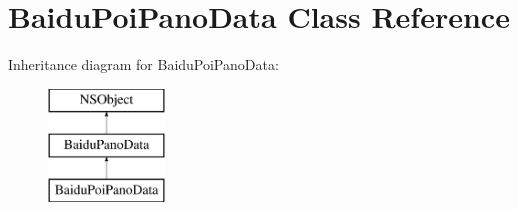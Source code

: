 \hypertarget{interface_baidu_poi_pano_data}{}\section{Baidu\+Poi\+Pano\+Data Class Reference}
\label{interface_baidu_poi_pano_data}
Inheritance diagram for Baidu\+Poi\+Pano\+Data\+:\begin{figure}[H]
\begin{center}
\leavevmode
\includegraphics[height=3.000000cm]{interface_baidu_poi_pano_data}
\end{center}
\end{figure}
